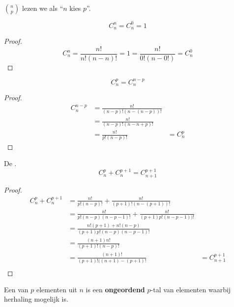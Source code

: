 \documentclass[main.tex]{subfiles}
\begin{document}
\begin{opm}
  $\binom{n}{p}$ lezen we als ``$n$ kies $p$''.
\end{opm}

\begin{ei}
  \[ C_{n}^{n} = C_{n}^{0} = 1 \]

  \begin{proof}
    \[ C_{n}^{n} = \frac{n!}{n!(n-n)!} = 1 = \frac{n!}{0!(n-0!)} = C_{n}^{0} \]
  \end{proof}
\end{ei}

\begin{ei}
  \[ C_{n}^{p} = C_{n}^{n-p} \]

  \begin{proof}
    \[
    \begin{array}{rll}
      C_{n}^{n-p} &= \frac{n!}{(n-p)!(n-(n-p))!} \\
                &= \frac{n!}{(n-p)!(n-n+p)!} \\
                &= \frac{n!}{p!(n-p)!} &= C_{n}^{p}
    \end{array}
    \]
  \end{proof}
\end{ei}

\begin{ei}
  De .
  \[ C_{n}^{p} + C_{n}^{p+1} = C_{n+1}^{p+1} \]

  \begin{proof}
    \[
    \begin{array}{rll}
      C_{n}^{p} + C_{n}^{p+1} &= \frac{n!}{p!(n-p)!} + \frac{n!}{(p+1)!(n-(p+1))!} \\
                           &= \frac{n!}{p!(n-p)(n-p-1)!} + \frac{n!}{(p+1)p!(n-p-1))!} \\
                           &= \frac{n!(p+1)+ n!(n-p)}{(p+1)p!(n-p)(n-p-1)!} \\
                           &= \frac{(n+1)n!}{(p+1)!(n-p)!} \\
                           &= \frac{(n+1)!}{(p+1)!((n+1)-(p+1)!} &= C_{n+1}^{p+1}\\
    \end{array}
    \]
  \end{proof}
\end{ei}

\begin{de}
  Een  van $p$ elementen uit $n$ is een \textbf{ongeordend} $p$-tal van elementen waarbij herhaling mogelijk is.
\end{de}
\end{document}
